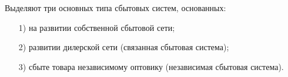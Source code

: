 Выделяют три основных типа сбытовых систем, основанных:
\begin{enumerate}
	\item [1)] на развитии собственной сбытовой сети;
	\item [2)] развитии дилерской сети (связанная сбытовая система);
	\item [3)] сбыте товара независимому оптовику (независимая сбытовая система).
\end{enumerate}
\cite[с. 251--254 ]{dybskaya}
















